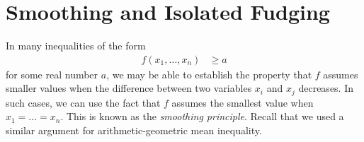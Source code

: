 \documentclass[inequalities.tex]{subfile}
\begin{document}
	\section{Smoothing and Isolated Fudging}\label{sec:smoothfudging}
	In many inequalities of the form
		\begin{align*}
			f(x_{1},\ldots,x_{n})
				& \geq a
		\end{align*}
	for some real number $a$, we may be able to establish the property that $f$ assumes smaller values when the difference between two variables $x_{i}$ and $x_{j}$ decreases. In such cases, we can use the fact that $f$ assumes the smallest value when $x_{1}=\ldots=x_{n}$. This is known as the \textit{smoothing principle}. Recall that we used a similar argument for arithmetic-geometric mean inequality.
\end{document}
